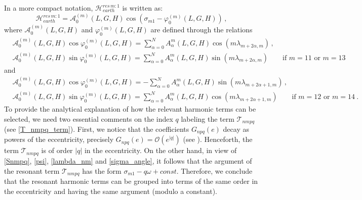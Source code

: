 \documentclass[12pt,reqno]{amsart}
\numberwithin{equation}{section}
\begin{document}
In a more compact notation,  $\mathcal{H}_{earth}^{res\,m:1}$ is written as:
\begin{equation}\label{Resonant_part_2}
\mathcal{H}_{earth}^{res\,m:1} = \mathcal{A}_0^{(m)}(L,G,H) \cos (\sigma_{m 1} -\varphi_0^{(m)}(L,G,H))\,,
\end{equation}
where  $\mathcal{A}_0^{(m)}(L,G,H)$ and $\varphi_0^{(m)}(L,G,H)$ are defined through the relations
\begin{equation}\label{A_varphi_11_13}
\begin{split}
& \mathcal{A}_0^{(m)}(L,G,H) \cos \varphi_0^{(m)}(L,G,H)=\sum_{\alpha=0}^N A_\alpha^m(L,G,H) \cos (m \lambda_{m+2\alpha , m})\,,\\
& \mathcal{A}_0^{(m)}(L,G,H) \sin \varphi_0^{(m)}(L,G,H)=\sum_{\alpha=0}^N A_\alpha^m(L,G,H) \sin (m \lambda_{m+2\alpha , m}) \qquad \textrm{if } m=11 \textrm{ or } m=13
\end{split}
\end{equation}
and
\begin{equation}\label{A_varphi_12_14}
\begin{split}
& \mathcal{A}_0^{(m)}(L,G,H) \cos \varphi_0^{(m)}(L,G,H)=-\sum_{\alpha=0}^N A_\alpha^m(L,G,H) \sin (m \lambda_{m+2\alpha+1 , m})\,,\\
& \mathcal{A}_0^{(m)}(L,G,H) \sin \varphi_0^{(m)}(L,G,H)=\sum_{\alpha=0}^N A_\alpha^m(L,G,H) \cos (m \lambda_{m+2\alpha+1 , m}) \qquad
\textrm{if } m=12 \textrm{ or } m=14\ .
\end{split}
\end{equation}
To provide the analytical explanation of how the relevant harmonic terms
can be selected, we need two essential comments on the index $q$ labeling the term
$\mathcal{T}_{nmpq}$ (see \eqref{T_nmpq_term}). First, we notice that the coefficients $G_{npq}(e)$
decay as powers of the eccentricity, precisely $G_{npq}(e)= \mathcal{O}(e^{|q|})$
(see \cite{Kaula, CGmajor}). Henceforth, the term $\mathcal{T}_{nmpq}$ is of order $|q|$ in the eccentricity.
On the other hand, in view of \eqref{Snmpq}, \eqref{psi}, \eqref{lambda_nm} and \eqref{sigma_angle},
it follows that the argument of the resonant term $\mathcal{T}_{nmpq}$ has the form $\sigma_{m1}-q \omega+const$.
Therefore, we conclude that the resonant harmonic terms can be grouped into terms of the same order in the eccentricity
and having the same argument (modulo a constant).
\end{document}

